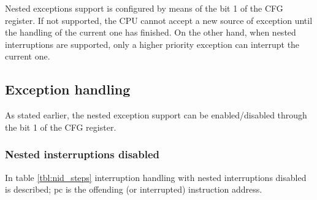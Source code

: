 Nested exceptions support is configured by means of the bit 1 of the CFG register. If not supported, the CPU cannot
accept a new source of exception until the handling of the current one has finished. On the other hand, when
nested interruptions are supported, only a higher priority exception can interrupt the current one.\\

\subsection{Exception handling}
\label{ssec:exception_handling}
As stated earlier, the nested exception support can be enabled/disabled through the bit 1 of the CFG register.

\subsubsection{Nested insterruptions disabled}
\label{sssec:nested_irq_disabled}
In table \ref{tbl:nid_steps} interruption handling with nested interruptions disabled is described; pc is the offending (or interrupted) instruction address.

